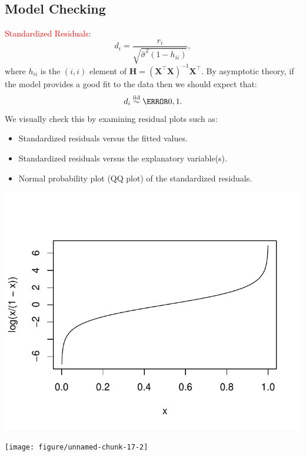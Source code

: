 \documentclass{article}\usepackage[]{graphicx}\usepackage[svgnames]{xcolor}
\makeatletter
\def\maxwidth{ %
  \ifdim\Gin@nat@width>\linewidth
    \linewidth
  \else
    \Gin@nat@width
  \fi
}
\newenvironment{knitrout}{}{} %
\newcommand*\circled[1]{\tikz[baseline=(char.base)]{\node[shape=circle,draw,inner sep=2pt] (char) {#1};}}
\newcommand{\iid}{\overset{\text{iid}}{\sim}}%
\providecommand{\Matrix}[1]{\bm{#1}}
\makeatother
\begin{document}
\subsection*{\circled{3} Model Checking}
\textcolor{Red}{Standardized Residuals}:
\[ d_i=\frac{r_i}{\sqrt{\hat{\sigma}^2(1-h_{ii})}},  \]
where $ h_{ii} $ is the $ (i,i) $ element of $ \Matrix{H}=(\Matrix{X}^\top\Matrix{X})^{-1}\Matrix{X}^\top $.
By asymptotic theory, if the model provides a good fit to the data then we
should expect that:
\[ d_i\iid \N{0,1}. \]
We visually check this by examining residual plots such as:
\begin{itemize}
      \item Standardized residuals versus the fitted values.
      \item Standardized residuals versus the explanatory variable(s).
      \item Normal probability plot (QQ plot) of the standardized residuals.
\end{itemize}
\begin{knitrout}
\color{fgcolor}

{\centering \includegraphics[width=\maxwidth]{figure/unnamed-chunk-17-1} 

}




{\centering \texttt{[image: figure/unnamed-chunk-17-2]} 

}


\end{knitrout}
\end{document}
